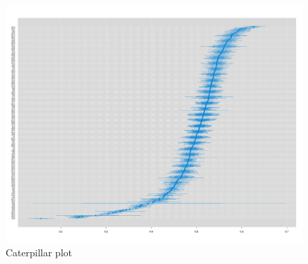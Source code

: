 \documentclass[12pt]{article}
\begin{document}
\begin{figure}[!h]
    \centering
    \includegraphics[width=1\linewidth]{pictures/caterpillar.png}
    \caption{Caterpillar plot}
    \label{fig:fullcaterpillar}
\end{figure}
\end{document}
